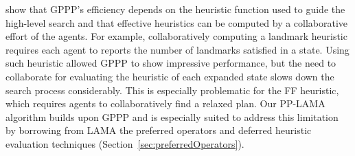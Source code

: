 \documentclass[letterpaper]{article}
\theoremstyle{definition}
\begin{document}


\cite{maliah2014privacyPreserving} show that GPPP's efficiency depends on the heuristic function used to guide the high-level search and that effective heuristics can be computed by a collaborative effort of the agents. For example, collaboratively computing a landmark heuristic requires each agent to reports the number of landmarks satisfied in a state. Using such heuristic allowed GPPP to show impressive performance, but the need to collaborate for evaluating the heuristic of each expanded state slows down the search process considerably.
This is especially problematic for the FF heuristic, which requires agents to collaboratively find a relaxed plan.
Our PP-LAMA algorithm builds upon GPPP and is especially suited to address this limitation by borrowing from LAMA the preferred operators and deferred heuristic evaluation techniques (Section~\ref{sec:preferredOperators}).



\end{document}
